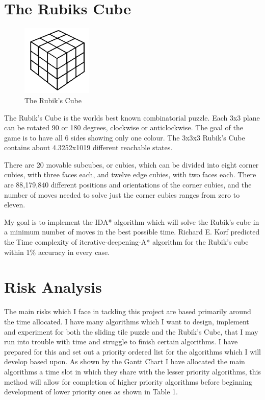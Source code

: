 \documentclass[proposal]{cmpreport}
\begin{document}
\section{The Rubiks Cube} \label{sec2}
\begin{figure}[ht]
	\centering
	\includegraphics[width=0.3\textwidth]{rubiks}
	\captionsetup{justification=centering}
	\caption{The Rubik's Cube}
\end{figure}
The Rubik's Cube is the worlds best known combinatorial puzzle. Each 3x3 plane can be rotated 90 or 180 
degrees, clockwise or anticlockwise. The goal of the game is to have all 6 sides showing only one colour. The 3x3x3 Rubik's Cube contains about 4.3252x1019 different reachable states.


There are 20 movable subcubes, or cubies, which can be divided into eight corner cubies, with three faces each, and twelve edge cubies, with two faces each.
There are 88,179,840 different positions and orientations of the corner cubies, and the number of moves needed to solve just the corner cubies ranges from
zero to eleven.\cite{DBLP:journals/ai/KorfF02}

My goal is to implement the IDA* algorithm which will solve the Rubik's cube in a minimum number of moves in the best possible time. Richard E. Korf predicted the Time complexity of iterative-deepening-A* algorithm for the Rubik's cube within 1\% accuracy in every case. \cite{DBLP:journals/ai/KorfRE01}

\clearpage



\section{Risk Analysis} \label{sec2}
The main risks which I face in tackling this project are based primarily around the time allocated. I have many algorithms which I want to design, implement and experiment for both the sliding tile puzzle and the Rubik's Cube, that I may run into trouble with time and struggle to finish certain algorithms. I have prepared for this and set out a priority ordered list for the algorithms which I will develop based upon. As shown by the Gantt Chart I have allocated the main algorithms a time slot in which they share with the lesser priority algorithms, this method will allow for completion of higher priority algorithms before beginning development of lower priority ones as shown in Table 1. 
\end{document}

